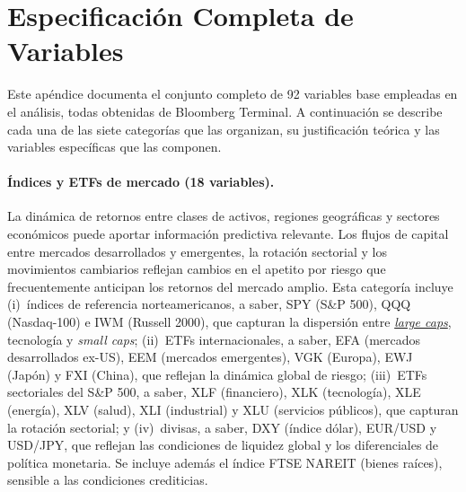 
\section{Especificaci\'on Completa de Variables}
\label{sec:appendix_variables}

Este ap\'endice documenta el conjunto completo de 92 variables base empleadas en el an\'alisis, todas obtenidas de Bloomberg Terminal. A continuaci\'on se describe cada una de las siete categor\'ias que las organizan, su justificaci\'on te\'orica y las variables espec\'ificas que las componen.

\paragraph{\'Indices y ETFs de mercado (18 variables).}
La din\'amica de retornos entre clases de activos, regiones geogr\'aficas y sectores econ\'omicos puede aportar informaci\'on predictiva relevante. Los flujos de capital entre mercados desarrollados y emergentes, la rotaci\'on sectorial y los movimientos cambiarios reflejan cambios en el apetito por riesgo que frecuentemente anticipan los retornos del mercado amplio. Esta categor\'ia incluye (i)~\'indices de referencia norteamericanos, a saber, SPY (S\&P 500), QQQ (Nasdaq-100) e IWM (Russell 2000), que capturan la dispersi\'on entre \hyperlink{glos:large_small_caps}{\textit{large caps}}, tecnolog\'ia y \textit{small caps}; (ii)~ETFs internacionales, a saber, EFA (mercados desarrollados ex-US), EEM (mercados emergentes), VGK (Europa), EWJ (Jap\'on) y FXI (China), que reflejan la din\'amica global de riesgo; (iii)~ETFs sectoriales del S\&P 500, a saber, XLF (financiero), XLK (tecnolog\'ia), XLE (energ\'ia), XLV (salud), XLI (industrial) y XLU (servicios p\'ublicos), que capturan la rotaci\'on sectorial; y (iv)~divisas, a saber, DXY (\'indice d\'olar), EUR/USD y USD/JPY, que reflejan las condiciones de liquidez global y los diferenciales de pol\'itica monetaria. Se incluye adem\'as el \'indice FTSE NAREIT (bienes ra\'ices), sensible a las condiciones crediticias.

